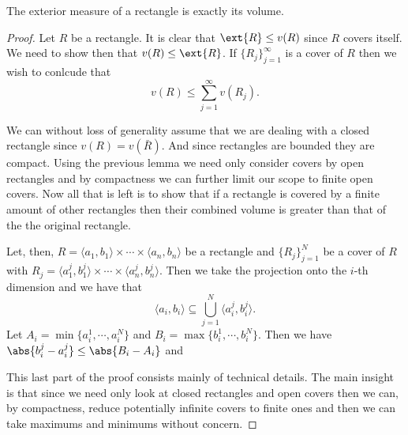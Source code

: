 \documentclass[12pt,oneside]{book}
\begin{document}
\begin{lemma} \label{lemma:exterior measure of rectangle}
	The exterior measure of a rectangle is exactly its volume.
\end{lemma}
\begin{proof}
	Let \( R \) be a rectangle. It is clear that \( \ext{R} \leq v(R) \) since \( R \) covers itself. We need to show then that \( v(R) \leq \ext{R} \). If \( \{ R_j \}_{j = 1}^\infty \) is a cover of \( R \) then we wish to conlcude that
	\begin{equation*}
		v(R) \leq \sum_{j = 1}^{\infty}v(R_j). 
	\end{equation*}

	We can without loss of generality assume that we are dealing with a closed rectangle since \( v(R) = v(\bar{R}) \). And since rectangles are bounded they are compact. Using the previous lemma we need only consider covers by open rectangles and by compactness we can further limit our scope to finite open covers. Now all that is left is to show that if a rectangle is covered by a finite amount of other rectangles then their combined volume is greater than that of the the original rectangle. 

	Let, then, \( R = \langle a_1,b_1 \rangle \times \cdots \times \langle a_n,b_n \rangle \) be a rectangle and \( \{ R_j \}_{j = 1}^N \) be a cover of \( R \) with \( R_j = \langle a^j_1,b^j_1 \rangle \times \cdots \times \langle a^j_n,b^j_n \rangle \). Then we take the projection onto the \( i \)-th dimension and we have that
	\begin{equation*}
		\langle a_i, b_i \rangle \subseteq \bigcup_{j = 1}^N \langle a^j_i, b^j_i \rangle.
	\end{equation*}
	Let \( A_i = \min \{ a^1_i, \cdots, a^N_i \} \) and \( B_i = \max \{ b^1_i, \cdots, b^N_i \} \). Then we have \( \abs{b^j_i - a^j_i} \leq \abs{B_i - A_i} \) and 

	This last part of the proof consists mainly of technical details. The main insight is that since we need only look at closed rectangles and open covers then we can, by compactness, reduce potentially infinite covers to finite ones and then we can take maximums and minimums without concern.
\end{proof}
\end{document}
